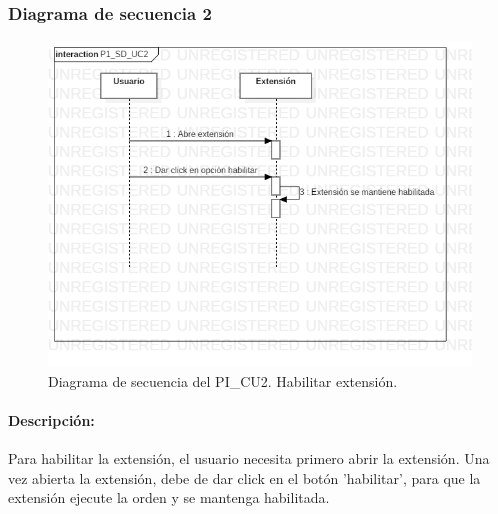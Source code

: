 \documentclass[12pt, a4paper, titlepage]{report}
\begin{document}
			    \subsubsection{Diagrama de secuencia 2}
			    \begin{figure}[H]
				    \begin{center} \includegraphics[width=15cm]{./imagenes/Desarrollo/Prototipo_1/P1_SD_UC2.png}
				    \caption[Diagrama de secuencia 2 del Prototipo I]{Diagrama de secuencia del PI\_CU2. Habilitar extensión.}
			        \end{center}
			    \end{figure}
			    
			    \paragraph{Descripción:}
			    Para habilitar la extensión, el usuario necesita primero abrir la extensión. Una vez abierta la extensión, debe de dar click en el botón 'habilitar', para que la extensión ejecute la orden y se mantenga habilitada.
			    
\end{document}
